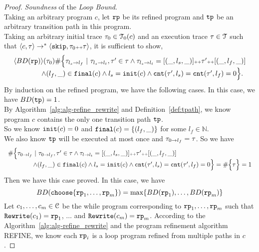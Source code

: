\begin{proof}
\emph{Soundness} of the \emph{Loop Bound}.
  \\
  Taking an arbitrary program $c$, let $\mathtt{rp}$ be its refined program and $\mathtt{tp}$ be an arbitrary transition path in this program.
  \\
Taking an arbitrary initial trace $\mathtt{\tau}_0 \in \mathcal{T}_0(c)$  and an execution trace $\mathtt{\tau} \in \mathcal{T}$
 such that $\langle {c}, \mathtt{\tau} \rangle \to^{*} \langle \mathtt{skip}, \mathtt{\tau}_0 {\scriptscriptstyle ++} \mathtt{\tau} \rangle$,
 it is sufficient to show,
 \[
  \begin{array}{l}
  \langle BD(\mathtt{rp}) \rangle(\mathtt{\tau}_0) 
  \# \Big\{\mathtt{\tau}_{l_s \to l_f} ~\vert~ \mathtt{\tau}_{l_s \to l_t}, \mathtt{\tau}' \in \mathtt{\tau} \land \mathtt{\tau}_{l_s \to l_t} = [(\_, l_s, \_)] {\scriptscriptstyle ++} \mathtt{\tau}' {\scriptscriptstyle ++} [(\_, l_f, \_)]
  \\ \qquad \qquad
  \land (l_{f}, \_) \in \mathtt{final}(c)
  \land l_s = \mathtt{init}(c)
  \land \mathtt{cnt}(\mathtt{\tau}', l_s) = \mathtt{cnt}(\mathtt{\tau}', l_f) = 0 
  \Big\}.
  \end{array}
\]
By induction on the refined program, we have the following cases.
\caseL{$\rprog = \tpath$}
In this case, we have $BD(\mathtt{tp}) = 1$.
\\
By Algorithm~\ref{alg:alg-refine_rewrite} and Definition~\ref{def:tpath}, we know program $c$ contains the only one transition path $\mathtt{tp}$.
\\
So we know $\mathtt{init}(c) = 0$ and $\mathtt{final}(c) = \{ (l_f, \_) \}$ for some $l_f \in \mathbb{N}$.
\\
We also know $\mathtt{tp}$ will be executed at most once and $\mathtt{\tau}_{0 \to l_f} = \mathtt{\tau}$. So we have
\[
  \begin{array}{l}
  \# \Big\{\mathtt{\tau}_{0 \to l_f} ~\vert~ \mathtt{\tau}_{0 \to l_f}, \mathtt{\tau}' \in \mathtt{\tau} \land \mathtt{\tau}_{l \to l_t} = [(\_, l_s, \_)] {\scriptscriptstyle ++} \mathtt{\tau}' {\scriptscriptstyle ++} [(\_, l_f, \_)]
  \\ \qquad \qquad
  \land (l_{f}, \_) \in \mathtt{final}(c)
  \land l_s = \mathtt{init}(c)
  \land \mathtt{cnt}(\mathtt{\tau}', l_s) = \mathtt{cnt}(\mathtt{\tau}', l_f) = 0 
  \Big\}
   = \# \Big\{\mathtt{\tau} \Big\} = 1
  \end{array}
\]
Then we have this case proved.
In this case, we have
\[
  BD(\rpchoose{\rprog_1, \ldots, \rprog_m }) = \max\left\{ BD(\rprog_1), \ldots, BD(\rprog_m) \right\}
\]
Let $c_1, \ldots, c_m \in \mathcal{C}$ be the while program corresponding to $\mathtt{rp}_1, \ldots, \mathtt{rp}_m$ such that $\mathtt{Rewrite}(c_1) = \mathtt{rp}_1$, $\ldots$ and  $\mathtt{Rewrite}(c_m) = \mathtt{rp}_m$.
According to the Algorithm~\ref{alg:alg-refine_rewrite} and the program refinement algorithm REFINE, we know each $\mathtt{rp}_i$ is a loop program refined from multiple paths in $c$.

\end{proof}
